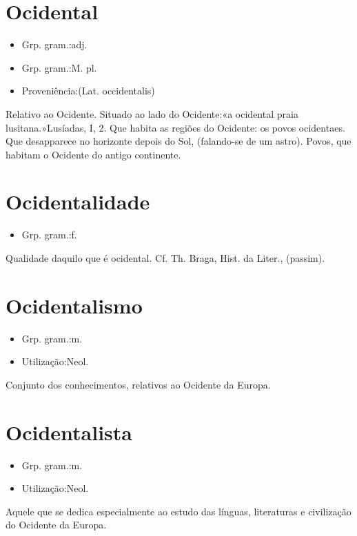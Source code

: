 \section{Ocidental}
\begin{itemize}
\item {Grp. gram.:adj.}
\end{itemize}
\begin{itemize}
\item {Grp. gram.:M. pl.}
\end{itemize}
\begin{itemize}
\item {Proveniência:(Lat. \textunderscore occidentalis\textunderscore )}
\end{itemize}
Relativo ao Ocidente.
Situado ao lado do Ocidente:«\textunderscore a ocidental praia lusitana.\textunderscore »\textunderscore Lusíadas\textunderscore , I, 2.
Que habita as regiões do Ocidente: \textunderscore os povos ocidentaes\textunderscore .
Que desapparece no horizonte depois do Sol, (falando-se de um astro).
Povos, que habitam o Ocidente do antigo continente.
\section{Ocidentalidade}
\begin{itemize}
\item {Grp. gram.:f.}
\end{itemize}
Qualidade daquilo que é ocidental. Cf. Th. Braga, \textunderscore Hist. da Liter.\textunderscore , (passim).
\section{Ocidentalismo}
\begin{itemize}
\item {Grp. gram.:m.}
\end{itemize}
\begin{itemize}
\item {Utilização:Neol.}
\end{itemize}
Conjunto dos conhecimentos, relativos ao Ocidente da Europa.
\section{Ocidentalista}
\begin{itemize}
\item {Grp. gram.:m.}
\end{itemize}
\begin{itemize}
\item {Utilização:Neol.}
\end{itemize}
Aquele que se dedica especialmente ao estudo das línguas, literaturas e civilização do Ocidente da Europa.
